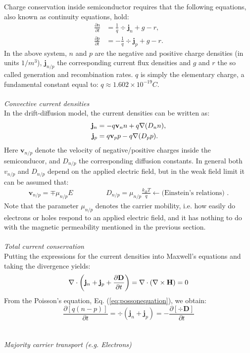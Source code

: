 Charge conservation inside semiconductor requires that the following equations, also known as continuity equations, hold:
\begin{align}
  \frac{\partial n}{\partial t} &= \frac{1}{q} \div \bm{j}_n +g-r \label{eq:continuity_n_charge} ,\\
  \frac{\partial p}{\partial t} &= -\frac{1}{q} \div \bm{j}_p +g-r \label{eq:continuity_p_charge} .
\end{align}
In the above system, $n$ and $p$ are the negative and positive charge densities (in units $1/m^3$), $\bm{j}_{n/p}$ the corresponding current flux densities and $g$ and $r$ the so called generation and recombination rates. $q$ is simply 
the elementary charge, a fundamental constant equal to: $q \approx  1.602\times 10^{-19}C$. \\\\
\emph{Convective current densities}\\

In the drift-diffusion model, the current densities can be written as:
\begin{align*}
  \mathbf{j}_n &= -q \mathbf{v}_n n + q\mathbf{\nabla} (D_n n), \\
  \mathbf{j}_p &=  q \mathbf{v}_p p - q\mathbf{\nabla} (D_p p).
\end{align*}
Here $\bm{v}_{n/p}$ denote the velocity of negative/positive charges inside the semiconducor, and $D_{n/p}$ the corresponding diffusion constants. In general both $v_{n/p}$ and $D_{n/p}$ depend on the applied electric field, but in the 
weak field limit it can be assumed that: 
\begin{align*}
  \bm{v}_{n/p} = \mp \mu_{n/p} E \hspace{2cm} D_{n/p}=\mu_{n/p} \frac{k_BT}{q}  \leftarrow \text{(Einstein's relations) }. 
\end{align*}
Note that the parameter $\mu_{n/p}$ denotes the carrier mobility, i.e. how easily do electrons or holes respond to an applied electric field, and it has nothing to do with the magnetic permeability mentioned in the previous section.\\\\
\emph{Total current conservation}\\

Putting the expressions for the current densities into Maxwell's equations and taking the divergence yields:
\begin{equation*}
  \mathbf{\nabla}\cdot \left ( \mathbf{j}_n + \mathbf{j}_p +\frac{\partial \mathbf{D}}{\partial t} \right ) = \mathbf{\nabla}\cdot (\mathbf{\nabla}\times \mathbf{H}) = 0
\end{equation*}
From the Poisson's equation, Eq. (\ref{eq:possonequation}), we obtain:
\begin{equation*}
  \frac{\partial [q(n-p)]}{\partial t} = \div \left (\bm{j}_n+\bm{j}_p \right ) = -\frac{\partial \left [\div \bm{D} \right ]}{\partial t} 
\end{equation*}
\\\\
\emph{Majority carrier transport (e.g. Electrons)} \\

